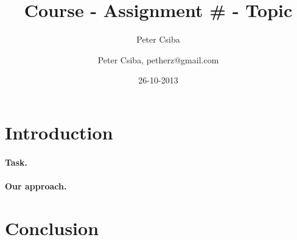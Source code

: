 \documentclass[12pt,a4paper]{article}
\author{Peter Csiba}
\title{Course - Assignment \# - Topic}
\date{26-10-2013}
\author{Peter Csiba, petherz@gmail.com}
\begin{document}
\maketitle

\section{Introduction}

\paragraph{Task.}

\paragraph{Our approach.} 


\section{Conclusion} 
\end{document}
